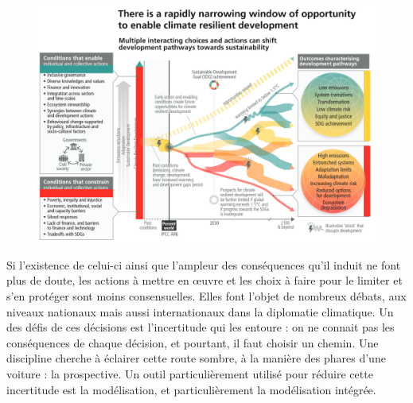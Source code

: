 \begin{figure}[h]
    \centering
    \includegraphics[width=\linewidth]{figures/trajectoire_spm6.png}
    \label{fig:pathways}
\end{figure}

Si l'existence de celui-ci ainsi que l'ampleur des conséquences qu'il induit ne font plus de doute, les actions à mettre en œuvre et les choix à faire pour le limiter et s'en protéger sont moins consensuelles. Elles font l'objet de nombreux débats, aux niveaux nationaux mais aussi internationaux dans la diplomatie climatique. Un des défis de ces décisions est l'incertitude qui les entoure : on ne connait pas les conséquences de chaque décision, et pourtant, il faut choisir un chemin. Une discipline cherche à éclairer cette route sombre, à la manière des phares d'une voiture : la prospective. Un outil particulièrement utilisé pour réduire cette incertitude est la modélisation, et particulièrement la modélisation intégrée. \\


